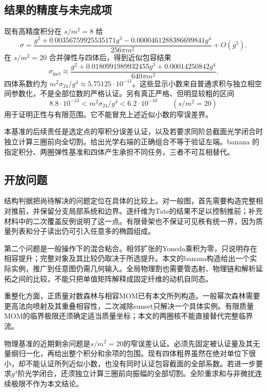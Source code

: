 \documentclass[11pt,a4paper,oneside]{ctexart}
\theoremstyle{cnplain}
\theoremstyle{definition}
\theoremstyle{remark}
\numberwithin{equation}{section}
\begin{document}
\subsection{结果的精度与未完成项}
现有高精度积分在 $s/m^2=8$ 给
\begin{equation}
 \sigma=\frac{g^2+0.00356759925535171g^3
 -0.0000461288386699841g^4}{256\pi m^2}+O(g^5).
\end{equation}
在 $s/m^2=20$ 合并弹性与四体后，得到近似包容结果
\begin{equation}
 \sigma_{\mathrm{incl}}\approx
 \frac{g^2+0.0180991989932455g^3+0.00014250842g^4}{640\pi m^2}.
\end{equation}
四体系数约为 $m^2\sigma_{24}/g^4\approx5.75125\cdot10^{-11}$。这些显示小数来自普通求积与独立相空间参数化，不是全部位数的严格认证。另有真正严格、但明显较粗的区间
\begin{equation}
 8.8\cdot10^{-13}<m^2\sigma_{24}/g^4<6.2\cdot10^{-10}
 \qquad(s/m^2=20)
\end{equation}
用于证明正性与有限范围。它不能冒充上述近似小数的窄误差界。

本基准的后续责任是选定点的窄积分误差认证，以及若要求同阶总截面光学闭合时独立计算三圈前向全切割。给出光学右端的正确组合不等于验证左端。banana 的指定积分、两圈弹性基准和四体产生承担不同任务，三者不可互相替代。



\endgroup
\subsection{开放问题}\label{ch:roadmap}
结构判据把尚待解决的问题定位在具体的比较上。对一般图，首先需要构造完整相对推前，并保留分支局部系统和边界。逐纤维为Tate的结果不足以控制推前；补充材料中的二次覆盖反例说明了这一点。有限骨架也不保证可见秩有统一界，因为质量列表和分子读出仍可引入任意多的椭圆组成。

第二个问题是一般操作下的混合粘合。相邻扩张的Yoneda乘积为零，只说明存在相容提升；完整对象及其比较仍取决于所选提升。本文的banana构造给出一个实际实例，推广到任意图仍需几何输入。全局物理割也需要管态射、物理链和解析延拓之间的比较，不能只把单值矩阵解释成固定纤维的动机自同态。

重整化方面，正质量对数森林与相容MOM已有本文所列构造。一般幂次森林需要更高法向喷射及其重叠相容性，二次减除sunset只解决一个具体实例。有限质量MOM的临界极限还须确定适当质量坐标；本文的两圈核不能直接替代完整临界流。

物理基准的近期剩余问题是$s/m^2=20$的窄误差认证。必须先固定被认证量及其无量纲归一化，再给出整个积分和余项的包围。现有四体粗界虽然在绝对单位下很小，却不能认证所列近似小数，也没有同时认证包容截面的全部系数。若进一步要求$g^4$阶光学闭合，还须独立计算三圈前向振幅的全部切割。全阶重求和与非微扰连续极限不作为本文结论。
\end{document}
